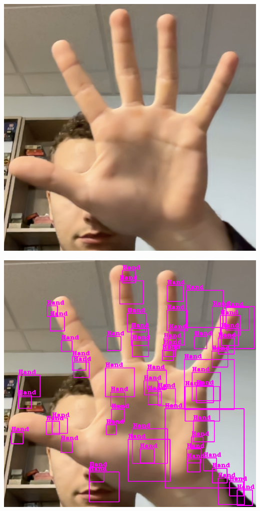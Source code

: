 \documentclass[11pt]{article}
\begin{document}
\begin{minipage}{0.45\textwidth}
    \centering
    \includegraphics[width=\textwidth]{images/cascade2.png}
    \label{fig:res_cascade2}
\end{minipage}
\begin{minipage}{0.45\textwidth}
    \centering
    \includegraphics[width=\textwidth]{images/cascade3.png}
    \label{fig:res_cascade3}
\end{minipage}
\end{document}
